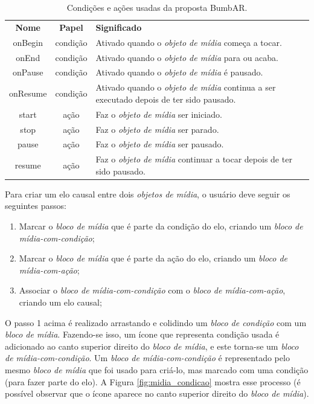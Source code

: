 \documentclass[../main.tex]{subfiles}
\begin{document}
\begin{table}[!h]
\small
\centering
\caption{Condições e ações usadas da proposta BumbAR.}
\label{tab:condicoes_acoes}
\begin{tabularx}{0.9\columnwidth}{ccX}
\toprule
\textbf{Nome} & \textbf{Papel} & \textbf{Significado}
\\\otoprule
onBegin       & condição     & Ativado quando o \emph{objeto de mídia} começa a tocar.
\\\midrule
onEnd         & condição     & Ativado quando o \emph{objeto de mídia} para ou acaba.
\\\midrule
onPause       & condição     & Ativado quando o \emph{objeto de mídia} é pausado.
\\\midrule
onResume      & condição     & Ativado quando o \emph{objeto de mídia} continua a ser executado depois de ter sido pausado.
\\\midrule
start         & ação        & Faz o \emph{objeto de mídia} ser iniciado.
\\\midrule
stop          & ação        & Faz o \emph{objeto de mídia} ser parado.
\\\midrule
pause         & ação        & Faz o \emph{objeto de mídia} ser pausado.
\\\midrule
resume        & ação        & Faz o \emph{objeto de mídia} continuar a tocar depois de ter sido pausado.
\\\midrule
\end{tabularx}
\end{table}

Para criar um elo causal entre dois \emph{objetos de mídia}, o usuário deve seguir os seguintes passos:

\begin{enumerate}
    \item Marcar o \emph{bloco de mídia} que é parte da condição do elo, criando um \emph{bloco de mídia-com-condição};
    \item Marcar o \emph{bloco de mídia} que é parte da ação do elo, criando um \emph{bloco de mídia-com-ação};
    \item Associar o \emph{bloco de mídia-com-condição} com o \emph{bloco de mídia-com-ação}, criando um elo causal;
\end{enumerate}

O passo 1 acima é realizado arrastando e colidindo um \emph{bloco de condição} com um \emph{bloco de mídia}. Fazendo-se isso, um ícone que representa condição usada é adicionado ao canto superior direito do \emph{bloco de mídia}, e este torna-se um \emph{bloco de mídia-com-condição}. Um \emph{bloco de mídia-com-condição} é representado pelo mesmo \emph{bloco de mídia} que foi usado para criá-lo, mas marcado com uma condição (para fazer parte do elo). A Figura \ref{fig:midia_condicao} mostra esse processo (é possível observar que o ícone aparece no canto superior direito do \emph{bloco de mídia}).
\end{document}
